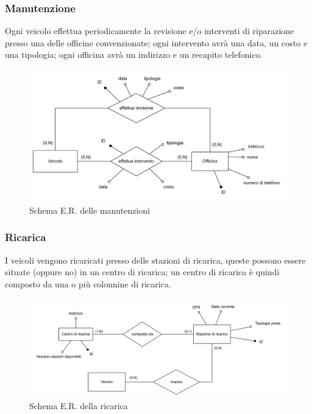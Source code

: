 \documentclass{article}
\begin{document}
\subsubsection{Manutenzione}

Ogni veicolo effettua periodicamente la revisione e/o interventi di riparazione presso una delle officine convenzionate; ogni intervento avrà una data, un costo e una tipologia; ogni officina avrà un indirizzo e un recapito telefonico.

\begin{figure}[H]
    \centering
    \includegraphics[width=1\linewidth]{bottom-up-manutenzione.png}
    \caption{Schema E.R. delle manutenzioni}
    \label{fig:bottom-up-manutenzioni}
\end{figure}

\subsubsection{Ricarica}

I veicoli vengono ricaricati presso delle stazioni di ricarica, queste possono essere situate (oppure no) in un centro di ricarica; un centro di ricarica è quindi composto da una o più colonnine di ricarica.

\begin{figure}[H]
    \centering
    \includegraphics[width=1\linewidth]{bottom-up-ricarica.png}
    \caption{Schema E.R. della ricarica}
    \label{fig:bottom-up-ricarica}
\end{figure}
\end{document}
